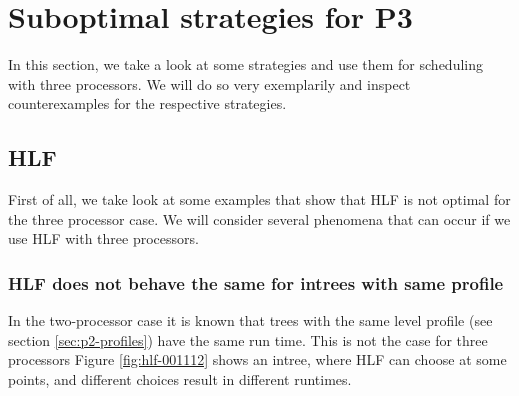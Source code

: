 \chapter{Suboptimal strategies for P3}
\label{chap:p3-suboptimal}

In this section, we take a look at some strategies and use them for scheduling with three processors. We will do so very exemplarily and inspect counterexamples for the respective strategies.


\section{HLF}
\label{sec:hlf-p3-suboptimal}

First of all, we take look at some examples that show that HLF is not optimal for the three processor case. We will consider several phenomena that can occur if we use HLF with three processors.

\subsection{HLF does not behave the same for intrees with same profile}
\label{sec:p3-suboptimal-hlf-same-profiles-different-run-times}

In the two-processor case it is known that trees with the same level profile (see section \ref{sec:p2-profiles}) have the same run time. This is not the case for three processors  Figure \ref{fig:hlf-001112} shows an intree, where HLF can choose at some points, and different choices result in different runtimes.

